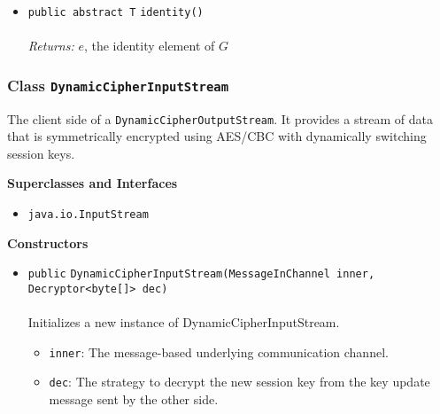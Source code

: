 \begin{itemize}
\item \lstinline|public abstract T| \lstinline|identity|\lstinline|()|\\ \\[-0.6em]
\emph{Returns:} $e$, the identity element of $G$



\end{itemize}

\subsubsection{Class \lstinline|DynamicCipherInputStream|}
The client side of a \lstinline|DynamicCipherOutputStream|. It provides a stream
 of data that is symmetrically encrypted using AES/CBC with dynamically
 switching session keys. \\
\noindent\begin{minipage}[t]{5cm}
\vspace{0.3em}
\hspace*{2em}
\vspace{0.3em}
\end{minipage}



\textbf{\sffamily Superclasses and Interfaces}
\begin{itemize}
\item \lstinline|java.io.InputStream|
\end{itemize}


\textbf{\sffamily Constructors}
\begin{itemize}
\item \lstinline|public| \lstinline|DynamicCipherInputStream|\lstinline|(MessageInChannel inner, Decryptor<byte[]> dec)|\\ \\[-0.6em]
Initializes a new instance of DynamicCipherInputStream.
\begin{itemize}
\item \lstinline|inner|: The message-based underlying communication channel.
\item \lstinline|dec|: The strategy to decrypt the new session key from the key
 update message sent by the other side.
\end{itemize}



\end{itemize}


